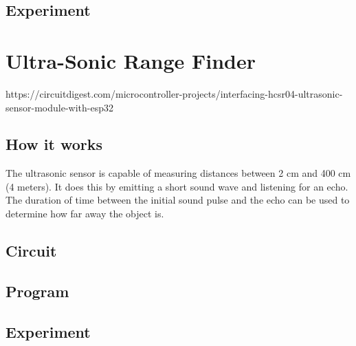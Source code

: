 \documentclass[12pt]{article}
\begin{document}
\subsection{Experiment}





\section{Ultra-Sonic Range Finder}

https://circuitdigest.com/microcontroller-projects/interfacing-hcsr04-ultrasonic-sensor-module-with-esp32




\subsection{How it works}

The ultrasonic sensor is capable of measuring distances between 2 cm and 400 cm (4 meters). It does this by emitting a short sound wave and listening for an echo. The duration of time between the initial sound pulse and the echo can be used to determine how far away the object is.

\subsection{Circuit}

\subsection{Program}

\subsection{Experiment}






\newpage
%
%

\printbibliography


	

\end{document}
